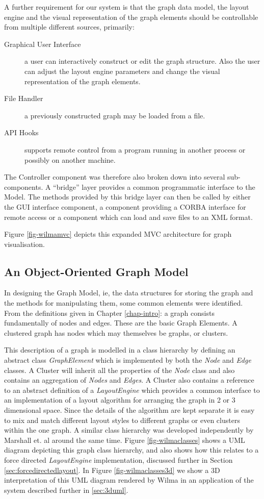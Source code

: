 \documentclass[runningheads]{cl2emult}
\begin{document}
A further requirement for our system is that the graph data model,
the layout engine and the visual representation of the graph elements should be controllable from multiple different sources, primarily:
\begin{description}
\item[Graphical User Interface] a user can interactively construct or edit the graph structure.  Also the user can adjust the layout engine parameters and change the visual representation of the graph elements.
\item[File Handler] a previously constructed graph may be loaded from a file.
\item[API Hooks] supports remote control from a program running in another process or possibly on
another machine. 
\end{description}
The Controller component was therefore also broken
down into several sub-components.  A ``bridge'' layer provides a common
programmatic interface to the Model.  The methods provided by this
bridge layer can then be called by either the GUI interface component,
a component providing a CORBA interface for remote access or a component which
can load and save files to an XML format.

Figure \ref{fig-wilmamvc} depicts this expanded MVC architecture for graph
visualisation. 

\subsection{An Object-Oriented Graph Model}
In designing the Graph Model, ie, the data structures for storing the
graph and the methods for manipulating them, some common
elements were identified.  From the definitions given in Chapter 
\ref{chap-intro}: a graph consists fundamentally
of nodes and edges.  These are the basic Graph Elements.  A clustered
graph has nodes which may themselves be graphs, or clusters.

This description of a graph is modelled in a class hierarchy by
defining an abstract class {\em GraphElement} which is implemented by
both the {\em Node} and {\em Edge} classes.  A {Cluster} will inherit
all the properties of the {\em Node} class and also contains an
aggregation of {\em Nodes} and {\em Edges}.  A {Cluster} also contains
a reference to an abstract definition of a {\em LayoutEngine} which
provides a common interface to an implementation of a layout algorithm
for arranging the graph in 2 or 3 dimensional space.  Since the
details of the algorithm are kept separate it is easy to mix and match
different layout styles to different graphs or even clusters within
the one graph.  A similar class hierarchy was developed independently
by Marshall et.  al\cite{marshall00object} around the same time.
Figure \ref{fig-wilmaclasses} shows a UML diagram depicting this
graph class hierarchy, and also shows how this relates to a force
directed {\em LayoutEngine} implementation, discussed further in
Section \ref{sec:forcedirectedlayout}.  In Figure
\ref{fig-wilmaclasses3d} we show a 3D
interpretation of this UML diagram rendered by Wilma in an application
of the system described further in \ref{sec:3duml}.
\end{document}
